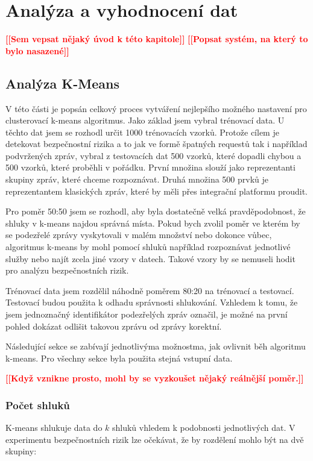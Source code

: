 \documentclass[thesis=M,czech]{FITthesis}[2012/10/20]
\newcommand{\todo}[1]{\textcolor{red}{\textbf{[[#1]]}}}
\newcommand{\blind}[1][1]{\textcolor{gray}{\Blindtext[#1][1]}}
\begin{document}
\chapter{Analýza a vyhodnocení dat}
	\todo{Sem vepsat nějaký úvod k této kapitole}
	\blind[1]
	\todo{Popsat systém, na který to bylo nasazené}
	\blind[1]
	\section{Analýza K-Means}
		V této části je popsán celkový proces vytváření nejlepšího možného nastavení pro clusterovací k-means algoritmus. Jako základ jsem vybral trénovací data. U těchto dat jsem se rozhodl určit 1000 trénovacích vzorků. Protože cílem je detekovat bezpečnostní rizika a to jak ve formě špatných requestů tak i například podvržených zpráv, vybral z testovacích dat 500 vzorků, které dopadli chybou a 500 vzorků, které proběhli v pořádku. První množina slouží jako reprezentanti skupiny zpráv, které chceme rozpoznávat. Druhá množina 500 prvků je reprezentantem klasických zpráv, které by měli přes integrační platformu proudit.
		
		Pro poměr 50:50 jsem se rozhodl, aby byla dostatečně velká pravděpodobnost, že shluky v k-means najdou správná místa. Pokud bych zvolil poměr ve kterém by se podezřelé zprávy vyskytovali v malém množství nebo dokonce vůbec, algoritmus k-means by mohl pomocí shluků například rozpoznávat jednotlivé služby nebo najít zcela jiné vzory v datech. Takové vzory by se nemuseli hodit pro analýzu bezpečnostních rizik.
		
		Trénovací data jsem rozdělil náhodně poměrem 80:20 na trénovací a testovací. Testovací budou použita k odhadu správnosti shlukování. Vzhledem k tomu, že jsem jednoznačný identifikátor podezřelých zpráv označil, je možné na první pohled dokázat odlišit takovou zprávu od zprávy korektní.
		
		Následující sekce se zabívají jednotlivýma možnostma, jak ovlivnit běh algoritmu k-means. Pro všechny sekce byla použita stejná vstupní data.
		
		\todo{Když vznikne prosto, mohl by se vyzkoušet nějaký reálnější poměr.}

		\subsection{Počet shluků}
			K-means shlukuje data do $k$ shluků vhledem k podobnosti jednotlivých dat. V experimentu bezpečnostních rizik lze očekávat, že by rozdělení mohlo být na dvě skupiny:
			
\end{document}
